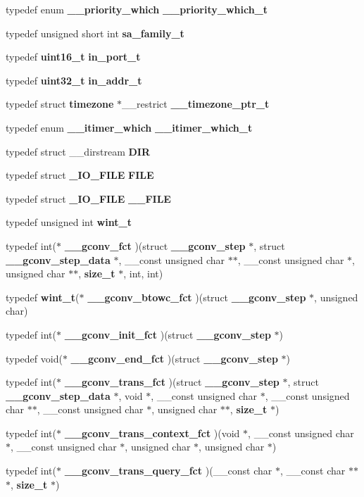 \begin{DoxyCompactItemize}
typedef enum {\bf \_\-\_\-priority\_\-which} {\bf \_\-\_\-priority\_\-which\_\-t}
\item 
typedef unsigned short int {\bf sa\_\-family\_\-t}
\item 
typedef {\bf uint16\_\-t} {\bf in\_\-port\_\-t}
\item 
typedef {\bf uint32\_\-t} {\bf in\_\-addr\_\-t}
\item 
typedef struct {\bf timezone} $\ast$\_\-\_\-restrict {\bf \_\-\_\-timezone\_\-ptr\_\-t}
\item 
typedef enum {\bf \_\-\_\-itimer\_\-which} {\bf \_\-\_\-itimer\_\-which\_\-t}
\item 
typedef struct \_\-\_\-dirstream {\bf DIR}
\item 
typedef struct {\bf \_\-IO\_\-FILE} {\bf FILE}
\item 
typedef struct {\bf \_\-IO\_\-FILE} {\bf \_\-\_\-FILE}
\item 
typedef unsigned int {\bf wint\_\-t}
\item 
typedef int($\ast$ {\bf \_\-\_\-gconv\_\-fct} )(struct {\bf \_\-\_\-gconv\_\-step} $\ast$, struct {\bf \_\-\_\-gconv\_\-step\_\-data} $\ast$, \_\-\_\-const unsigned char $\ast$$\ast$, \_\-\_\-const unsigned char $\ast$, unsigned char $\ast$$\ast$, {\bf size\_\-t} $\ast$, int, int)
\item 
typedef {\bf wint\_\-t}($\ast$ {\bf \_\-\_\-gconv\_\-btowc\_\-fct} )(struct {\bf \_\-\_\-gconv\_\-step} $\ast$, unsigned char)
\item 
typedef int($\ast$ {\bf \_\-\_\-gconv\_\-init\_\-fct} )(struct {\bf \_\-\_\-gconv\_\-step} $\ast$)
\item 
typedef void($\ast$ {\bf \_\-\_\-gconv\_\-end\_\-fct} )(struct {\bf \_\-\_\-gconv\_\-step} $\ast$)
\item 
typedef int($\ast$ {\bf \_\-\_\-gconv\_\-trans\_\-fct} )(struct {\bf \_\-\_\-gconv\_\-step} $\ast$, struct {\bf \_\-\_\-gconv\_\-step\_\-data} $\ast$, void $\ast$, \_\-\_\-const unsigned char $\ast$, \_\-\_\-const unsigned char $\ast$$\ast$, \_\-\_\-const unsigned char $\ast$, unsigned char $\ast$$\ast$, {\bf size\_\-t} $\ast$)
\item 
typedef int($\ast$ {\bf \_\-\_\-gconv\_\-trans\_\-context\_\-fct} )(void $\ast$, \_\-\_\-const unsigned char $\ast$, \_\-\_\-const unsigned char $\ast$, unsigned char $\ast$, unsigned char $\ast$)
\item 
typedef int($\ast$ {\bf \_\-\_\-gconv\_\-trans\_\-query\_\-fct} )(\_\-\_\-const char $\ast$, \_\-\_\-const char $\ast$$\ast$$\ast$, {\bf size\_\-t} $\ast$)

\end{DoxyCompactItemize}
